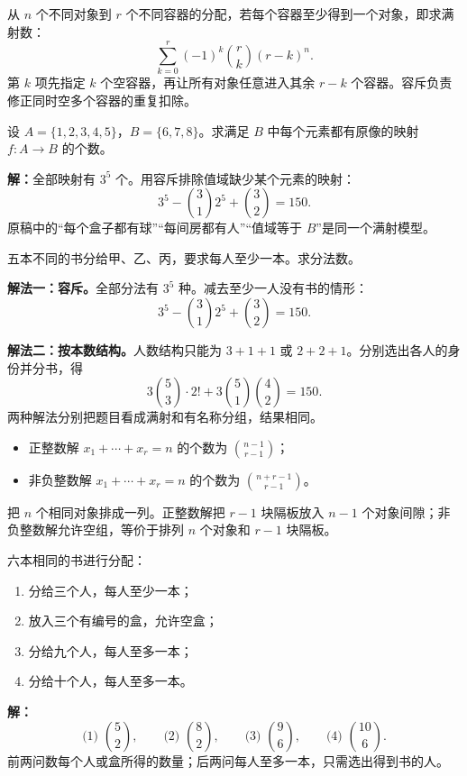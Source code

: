 \begin{lawbox}[满射的容斥计数]
  从 $n$ 个不同对象到 $r$ 个不同容器的分配，若每个容器至少得到一个对象，即求满射数：
  \[
    \sum_{k=0}^{r}(-1)^k\binom rk(r-k)^n.
  \]
  第 $k$ 项先指定 $k$ 个空容器，再让所有对象任意进入其余 $r-k$ 个容器。容斥负责修正同时空多个容器的重复扣除。
\end{lawbox}

\begin{examplebox}
  设 $A=\{1,2,3,4,5\}$，$B=\{6,7,8\}$。求满足 $B$ 中每个元素都有原像的映射 $f:A\to B$ 的个数。

  \textbf{解：}全部映射有 $3^5$ 个。用容斥排除值域缺少某个元素的映射：
  \[
    3^5-\binom31 2^5+\binom32=150.
  \]
  原稿中的“每个盒子都有球”“每间房都有人”“值域等于 $B$”是同一个满射模型。
\end{examplebox}

\begin{examplebox}
  五本不同的书分给甲、乙、丙，要求每人至少一本。求分法数。

  \textbf{解法一：容斥。}全部分法有 $3^5$ 种。减去至少一人没有书的情形：
  \[
    3^5-\binom31 2^5+\binom32=150.
  \]

  \textbf{解法二：按本数结构。}人数结构只能为 $3+1+1$ 或 $2+2+1$。分别选出各人的身份并分书，得
  \[
    3\binom53\cdot2!+3\binom51\binom42=150.
  \]
  两种解法分别把题目看成满射和有名称分组，结果相同。
\end{examplebox}

\begin{lawbox}[隔板法]
  \begin{itemize}
    \item 正整数解 $x_1+\cdots+x_r=n$ 的个数为 $\binom{n-1}{r-1}$；
    \item 非负整数解 $x_1+\cdots+x_r=n$ 的个数为 $\binom{n+r-1}{r-1}$。
  \end{itemize}
  把 $n$ 个相同对象排成一列。正整数解把 $r-1$ 块隔板放入 $n-1$ 个对象间隙；非负整数解允许空组，等价于排列 $n$ 个对象和 $r-1$ 块隔板。
\end{lawbox}

\begin{examplebox}
  六本相同的书进行分配：
  \begin{enumerate}
    \item 分给三个人，每人至少一本；
    \item 放入三个有编号的盒，允许空盒；
    \item 分给九个人，每人至多一本；
    \item 分给十个人，每人至多一本。
  \end{enumerate}

  \textbf{解：}
  \[
    \text{(1) }\binom52,\qquad
    \text{(2) }\binom82,\qquad
    \text{(3) }\binom96,\qquad
    \text{(4) }\binom{10}6.
  \]
  前两问数每个人或盒所得的数量；后两问每人至多一本，只需选出得到书的人。
\end{examplebox}

